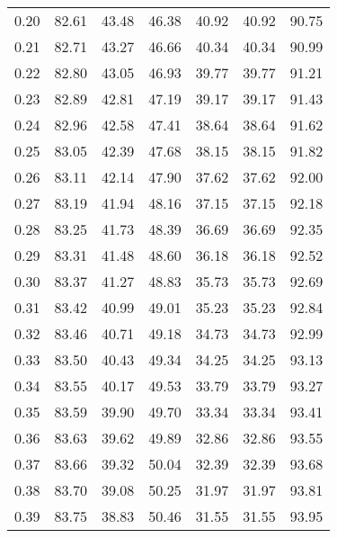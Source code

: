 \begin{tabular}{|c|c|c|c|c|c|c|}
      0.20 &     82.61 &     43.48 &      46.38 &   40.92 &      40.92 &         90.75 \\
      0.21 &     82.71 &     43.27 &      46.66 &   40.34 &      40.34 &         90.99 \\
      0.22 &     82.80 &     43.05 &      46.93 &   39.77 &      39.77 &         91.21 \\
      0.23 &     82.89 &     42.81 &      47.19 &   39.17 &      39.17 &         91.43 \\
      0.24 &     82.96 &     42.58 &      47.41 &   38.64 &      38.64 &         91.62 \\
      0.25 &     83.05 &     42.39 &      47.68 &   38.15 &      38.15 &         91.82 \\
      0.26 &     83.11 &     42.14 &      47.90 &   37.62 &      37.62 &         92.00 \\
      0.27 &     83.19 &     41.94 &      48.16 &   37.15 &      37.15 &         92.18 \\
      0.28 &     83.25 &     41.73 &      48.39 &   36.69 &      36.69 &         92.35 \\
      0.29 &     83.31 &     41.48 &      48.60 &   36.18 &      36.18 &         92.52 \\
      0.30 &     83.37 &     41.27 &      48.83 &   35.73 &      35.73 &         92.69 \\
      0.31 &     83.42 &     40.99 &      49.01 &   35.23 &      35.23 &         92.84 \\
      0.32 &     83.46 &     40.71 &      49.18 &   34.73 &      34.73 &         92.99 \\
      0.33 &     83.50 &     40.43 &      49.34 &   34.25 &      34.25 &         93.13 \\
      0.34 &     83.55 &     40.17 &      49.53 &   33.79 &      33.79 &         93.27 \\
      0.35 &     83.59 &     39.90 &      49.70 &   33.34 &      33.34 &         93.41 \\
      0.36 &     83.63 &     39.62 &      49.89 &   32.86 &      32.86 &         93.55 \\
      0.37 &     83.66 &     39.32 &      50.04 &   32.39 &      32.39 &         93.68 \\
      0.38 &     83.70 &     39.08 &      50.25 &   31.97 &      31.97 &         93.81 \\
      0.39 &     83.75 &     38.83 &      50.46 &   31.55 &      31.55 &         93.95 \\

\end{tabular}
